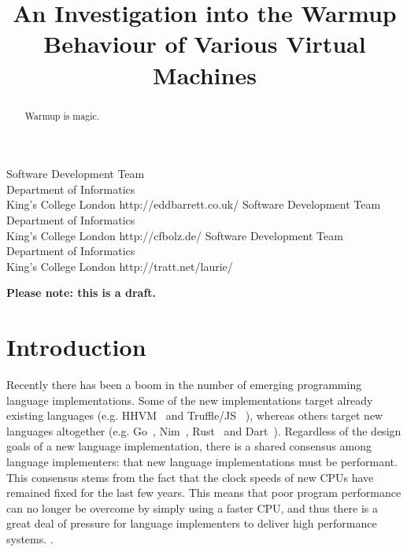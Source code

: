 \documentclass[10pt,preprint]{sigplanconf}
\begin{document}
\title{An Investigation into the Warmup Behaviour of Various Virtual Machines}
           {Software Development Team\\ Department of Informatics\\ King's College London}
           {http://eddbarrett.co.uk/}
           {Software Development Team\\ Department of Informatics\\ King's College London}
           {http://cfbolz.de/}
           {Software Development Team\\ Department of Informatics\\ King's College London}
           {http://tratt.net/laurie/}

\maketitle

\noindent\textbf{Please note: this is a draft.}

\begin{abstract}
Warmup is magic.
\end{abstract}

\section{Introduction}
\label{sec:intro}


Recently there has been a boom in the number of emerging programming language
implementations. Some of the new implementations target already existing
languages (e.g. HHVM~\cite{XXX} and Truffle/JS ~\cite{XXX}), whereas others
target new languages altogether (e.g. Go~\cite{XXX}, Nim~\cite{XXX},
Rust~\cite{XXX} and Dart~\cite{XXX}). Regardless of the design goals of a new
language implementation, there is a shared consensus among language
implementers: that new language implementations must be performant.  This
consensus stems from the fact that the clock speeds of new CPUs have remained
fixed for the last few years. This means that poor program performance can no
longer be overcome by simply using a faster CPU, and thus there is a great deal
of pressure for language implementers to deliver high performance systems.
.
\end{document}
